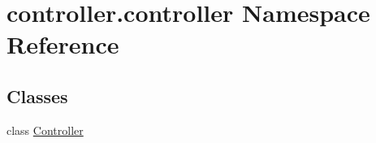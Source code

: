 \hypertarget{namespacecontroller_1_1controller}{}\section{controller.\+controller Namespace Reference}
\label{namespacecontroller_1_1controller}
\subsection*{Classes}
\begin{DoxyCompactItemize}
\item 
class \hyperlink{classcontroller_1_1controller_1_1Controller}{Controller}
\end{DoxyCompactItemize}

